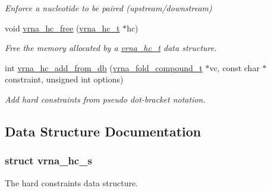 \begin{DoxyCompactItemize}
\begin{DoxyCompactList}\small\item\em Enforce a nucleotide to be paired (upstream/downstream) \end{DoxyCompactList}\item 
void \mbox{\hyperlink{group__hard__constraints_ga696dcf77887d856c6f21ea266d8b9ca2}{vrna\+\_\+hc\+\_\+free}} (\mbox{\hyperlink{group__hard__constraints_gac7e4c4f8abe3163a68110c5bff24e01d}{vrna\+\_\+hc\+\_\+t}} $\ast$hc)
\begin{DoxyCompactList}\small\item\em Free the memory allocated by a \mbox{\hyperlink{group__hard__constraints_gac7e4c4f8abe3163a68110c5bff24e01d}{vrna\+\_\+hc\+\_\+t}} data structure. \end{DoxyCompactList}\item 
int \mbox{\hyperlink{group__hard__constraints_ga5b4de3247b67358080c176b94591a8e6}{vrna\+\_\+hc\+\_\+add\+\_\+from\+\_\+db}} (\mbox{\hyperlink{group__fold__compound_ga1b0cef17fd40466cef5968eaeeff6166}{vrna\+\_\+fold\+\_\+compound\+\_\+t}} $\ast$vc, const char $\ast$constraint, unsigned int options)
\begin{DoxyCompactList}\small\item\em Add hard constraints from pseudo dot-\/bracket notation. \end{DoxyCompactList}\end{DoxyCompactItemize}


\subsection{Data Structure Documentation}
\label{structvrna__hc__s}
\subsubsection{struct vrna\+\_\+hc\+\_\+s}
The hard constraints data structure. 

